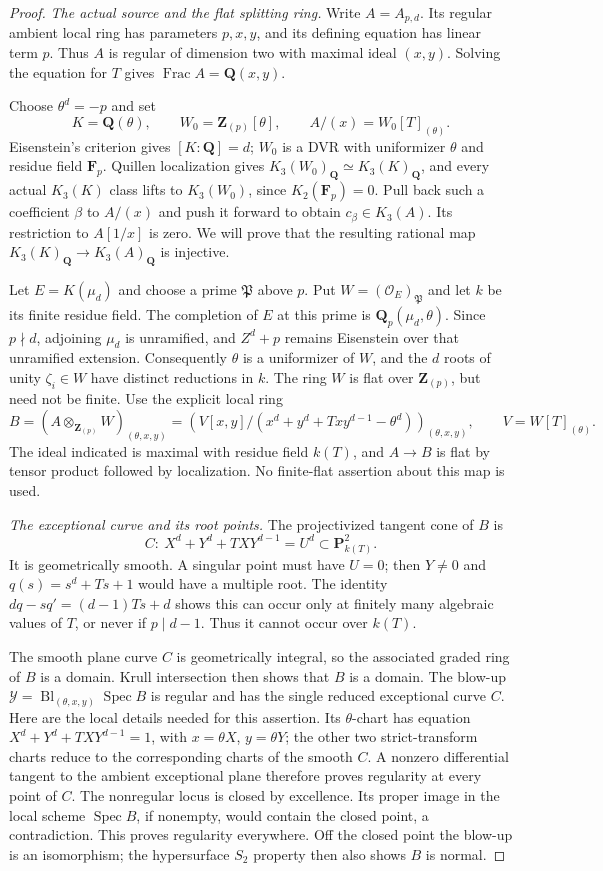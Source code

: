 \documentclass[11pt,a4paper]{article}
\theoremstyle{remark}
\newcommand{\Z}{\mathbf Z}
\newcommand{\Q}{\mathbf Q}
\newcommand{\F}{\mathbf F}
\newcommand{\Spec}{\operatorname{Spec}}
\newcommand{\Frac}{\operatorname{Frac}}
\begin{document}
\begin{proof}
\emph{The actual source and the flat splitting ring.}
Write $A=A_{p,d}$. Its regular ambient local ring has parameters
$p,x,y$, and its defining equation has linear term $p$.
Thus $A$ is regular of dimension two with maximal ideal $(x,y)$.
Solving the equation for $T$ gives $\Frac A=\Q(x,y)$.

Choose $\theta^d=-p$ and set
\[
 K=\Q(\theta),\qquad W_0=\Z_{(p)}[\theta],\qquad
 A/(x)=W_0[T]_{(\theta)}.
\]
Eisenstein's criterion gives $[K:\Q]=d$; $W_0$ is a DVR with
uniformizer $\theta$ and residue field $\F_p$.
Quillen localization gives
$K_3(W_0)_{\Q}\simeq K_3(K)_{\Q}$, and every actual
$K_3(K)$ class lifts to $K_3(W_0)$, since $K_2(\F_p)=0$.
Pull back such a coefficient $\beta$ to $A/(x)$ and push it
forward to obtain $c_\beta\in K_3(A)$. Its restriction to
$A[1/x]$ is zero. We will prove that the resulting rational map
$K_3(K)_{\Q}\to K_3(A)_{\Q}$ is injective.

Let $E=K(\mu_d)$ and choose a prime $\mathfrak P$ above $p$.
Put $W=(\mathcal O_E)_{\mathfrak P}$ and let $k$ be its finite
residue field. The completion of $E$ at this prime is
$\Q_p(\mu_d,\theta)$. Since $p\nmid d$, adjoining $\mu_d$
is unramified, and $Z^d+p$ remains Eisenstein over that
unramified extension. Consequently $\theta$ is a uniformizer
of $W$, and the $d$ roots of unity $\zeta_i\in W$ have distinct
reductions in $k$.
The ring $W$ is flat over $\Z_{(p)}$, but need not be finite.
Use the explicit local ring
\[
 B=(A\otimes_{\Z_{(p)}}W)_{(\theta,x,y)}
  =\left(V[x,y]/
      (x^d+y^d+Txy^{d-1}-\theta^d)\right)_{(\theta,x,y)},
 \qquad V=W[T]_{(\theta)}.
\]
The ideal indicated is maximal with residue field $k(T)$, and
$A\to B$ is flat by tensor product followed by localization.
No finite-flat assertion about this map is used.

\emph{The exceptional curve and its root points.}
The projectivized tangent cone of $B$ is
\[
 C:\ X^d+Y^d+TXY^{d-1}=U^d
       \subset\mathbf P^2_{k(T)}.
\]
It is geometrically smooth. A singular point must have $U=0$;
then $Y\ne0$ and $q(s)=s^d+Ts+1$ would have a multiple root.
The identity $dq-sq'=(d-1)Ts+d$ shows this can occur only at
finitely many algebraic values of $T$, or never if $p\mid d-1$.
Thus it cannot occur over $k(T)$.

The smooth plane curve $C$ is geometrically integral, so the
associated graded ring of $B$ is a domain. Krull intersection
then shows that $B$ is a domain. The blow-up
$\mathcal Y=\operatorname{Bl}_{(\theta,x,y)}\Spec B$
is regular and has the single reduced exceptional curve $C$.
Here are the local details needed for this assertion. Its
$\theta$-chart has equation
$X^d+Y^d+TXY^{d-1}=1$, with $x=\theta X$, $y=\theta Y$;
the other two strict-transform charts reduce to the corresponding
charts of the smooth $C$. A nonzero differential tangent to
the ambient exceptional plane therefore proves regularity at
every point of $C$. The nonregular locus is closed by excellence.
Its proper image in the local scheme $\Spec B$, if nonempty,
would contain the closed point, a contradiction. This proves
regularity everywhere.
Off the closed point the blow-up is an isomorphism; the
hypersurface $S_2$ property then also shows $B$ is normal.


\end{proof}
\end{document}

